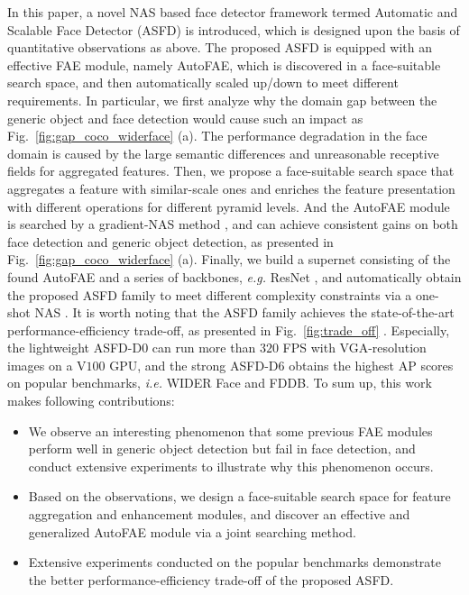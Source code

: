 \documentclass[sigconf]{acmart}
\begin{document}
In this paper, a novel NAS based face detector framework termed Automatic and Scalable Face Detector (ASFD) is introduced, which is designed upon the basis of quantitative observations as above. 
The proposed ASFD is equipped with an effective FAE module, namely AutoFAE, which is discovered in a face-suitable search space, and then automatically scaled up/down to meet different requirements.
In particular, we first analyze why the domain gap between the generic object and face detection would cause such an impact as Fig.~\ref{fig:gap_coco_widerface} (a). The performance degradation in the face domain is caused by the large semantic differences and unreasonable receptive fields for aggregated features.
Then, we propose a face-suitable search space that aggregates a feature with similar-scale ones and enriches the feature presentation with different operations for different pyramid levels. And the AutoFAE module is searched by a gradient-NAS method \cite{liu2018darts,xu2019pcdarts}, and can achieve consistent gains on both face detection and generic object detection, as presented in Fig.~\ref{fig:gap_coco_widerface} (a). 
Finally, we build a supernet consisting of the found AutoFAE and a series of backbones, \textit{e.g.} ResNet \cite{he2016resnet}, and automatically obtain the proposed ASFD family to meet different complexity constraints via a one-shot NAS \cite{guo2019spos,chu2019fairnas}.
It is worth noting that the ASFD family achieves the state-of-the-art performance-efficiency trade-off, as presented in Fig.~\ref{fig:trade_off} \cite{yoo2019extd,chi2019srn,tang2018pyramidbox,li2019dsfd,zhang2020refineface}. Especially, the lightweight ASFD-D$0$ can run more than $320$ FPS with VGA-resolution images on a V$100$ GPU, and the strong ASFD-D$6$ obtains the highest AP scores on popular benchmarks, \textit{i.e.} WIDER Face and FDDB. To sum up, this work makes following contributions:


\begin{itemize}
\item We observe an interesting phenomenon that some previous FAE modules perform well in generic object detection but fail in face detection, and conduct extensive experiments to illustrate why this phenomenon occurs.
    \item Based on the observations, we design a face-suitable search space for feature aggregation and enhancement modules, and discover an effective and generalized AutoFAE module via a joint searching method.
    \item Extensive experiments conducted on the popular benchmarks demonstrate the better performance-efficiency trade-off of the proposed ASFD.
\end{itemize}
\end{document}
